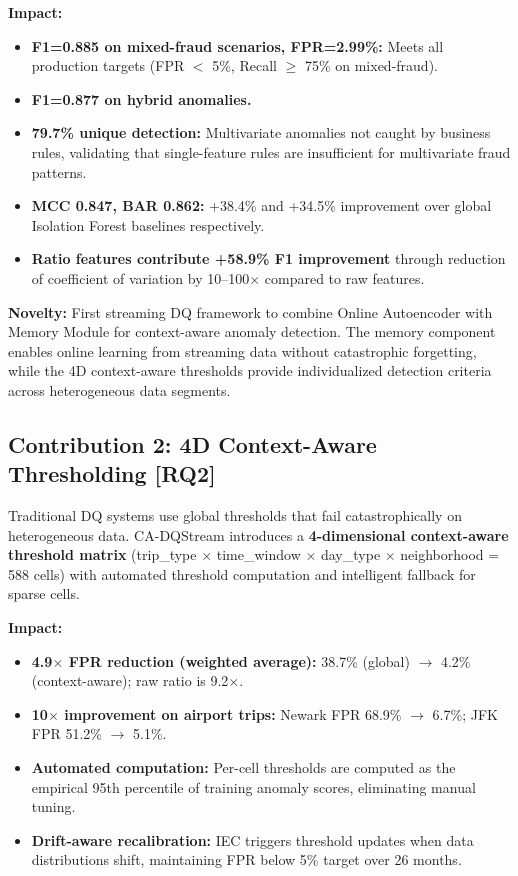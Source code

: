 \textbf{Impact:}
\begin{itemize}
    \item \textbf{F1=0.885 on mixed-fraud scenarios, FPR=2.99\%:} Meets all production targets (FPR $<$ 5\%, Recall $\geq$ 75\% on mixed-fraud).
    \item \textbf{F1=0.877 on hybrid anomalies.}
    \item \textbf{79.7\% unique detection:} Multivariate anomalies not caught by business rules, validating that single-feature rules are insufficient for multivariate fraud patterns.
    \item \textbf{MCC 0.847, BAR 0.862:} +38.4\% and +34.5\% improvement over global Isolation Forest baselines respectively.
    \item \textbf{Ratio features contribute +58.9\% F1 improvement} through reduction of coefficient of variation by 10--100$\times$ compared to raw features.
\end{itemize}

\textbf{Novelty:} First streaming DQ framework to combine Online Autoencoder with Memory Module for context-aware anomaly detection. The memory component enables online learning from streaming data without catastrophic forgetting, while the 4D context-aware thresholds provide individualized detection criteria across heterogeneous data segments.

\subsection{Contribution 2: 4D Context-Aware Thresholding [RQ2]}

Traditional DQ systems use global thresholds that fail catastrophically on heterogeneous data. CA-DQStream introduces a \textbf{4-dimensional context-aware threshold matrix} (trip\_type $\times$ time\_window $\times$ day\_type $\times$ neighborhood = 588 cells) with automated threshold computation and intelligent fallback for sparse cells.

\textbf{Impact:}
\begin{itemize}
    \item \textbf{4.9$\times$ FPR reduction (weighted average):} 38.7\% (global) $\to$ 4.2\% (context-aware); raw ratio is 9.2$\times$.
    \item \textbf{10$\times$ improvement on airport trips:} Newark FPR 68.9\% $\to$ 6.7\%; JFK FPR 51.2\% $\to$ 5.1\%.
    \item \textbf{Automated computation:} Per-cell thresholds are computed as the empirical 95th percentile of training anomaly scores, eliminating manual tuning.
    \item \textbf{Drift-aware recalibration:} IEC triggers threshold updates when data distributions shift, maintaining FPR below 5\% target over 26 months.
\end{itemize}

